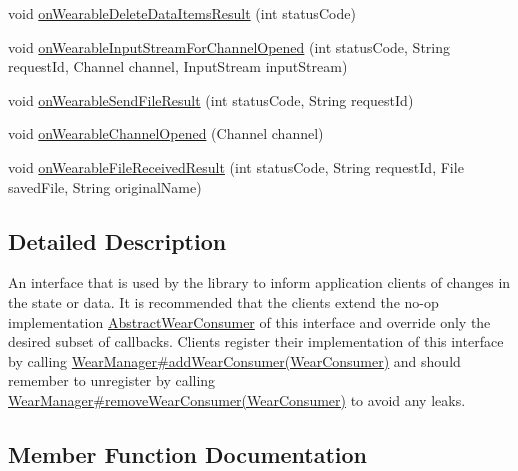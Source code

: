 \begin{DoxyCompactItemize}
\item 
void \hyperlink{interfacecom_1_1google_1_1devrel_1_1wcl_1_1callbacks_1_1WearConsumer_aa583d2bbacb7eca35ae83488fbc32f62}{on\+Wearable\+Delete\+Data\+Items\+Result} (int status\+Code)
\item 
void \hyperlink{interfacecom_1_1google_1_1devrel_1_1wcl_1_1callbacks_1_1WearConsumer_ab3785816c06c30602573a978fd869da8}{on\+Wearable\+Input\+Stream\+For\+Channel\+Opened} (int status\+Code, String request\+Id, Channel channel, Input\+Stream input\+Stream)
\item 
void \hyperlink{interfacecom_1_1google_1_1devrel_1_1wcl_1_1callbacks_1_1WearConsumer_a6c975822ee9bce8a0294b8f1ca1ae838}{on\+Wearable\+Send\+File\+Result} (int status\+Code, String request\+Id)
\item 
void \hyperlink{interfacecom_1_1google_1_1devrel_1_1wcl_1_1callbacks_1_1WearConsumer_a4c9198d346b1914ff20b5291aceb2957}{on\+Wearable\+Channel\+Opened} (Channel channel)
\item 
void \hyperlink{interfacecom_1_1google_1_1devrel_1_1wcl_1_1callbacks_1_1WearConsumer_a5dbc5ac2372eb9f0833ae5ebfb0a2c9c}{on\+Wearable\+File\+Received\+Result} (int status\+Code, String request\+Id, File saved\+File, String original\+Name)
\end{DoxyCompactItemize}


\subsection{Detailed Description}
An interface that is used by the library to inform application clients of changes in the state or data. It is recommended that the clients extend the no-\/op implementation \hyperlink{classcom_1_1google_1_1devrel_1_1wcl_1_1callbacks_1_1AbstractWearConsumer}{Abstract\+Wear\+Consumer} of this interface and override only the desired subset of callbacks. Clients register their implementation of this interface by calling \hyperlink{classcom_1_1google_1_1devrel_1_1wcl_1_1WearManager_ab1ead896194d81adf7750d73e146d7d4}{Wear\+Manager\#add\+Wear\+Consumer(\+Wear\+Consumer)} and should remember to unregister by calling \hyperlink{classcom_1_1google_1_1devrel_1_1wcl_1_1WearManager_a473eca98cfa817fb734f7342bc045ce1}{Wear\+Manager\#remove\+Wear\+Consumer(\+Wear\+Consumer)} to avoid any leaks. 

\subsection{Member Function Documentation}
